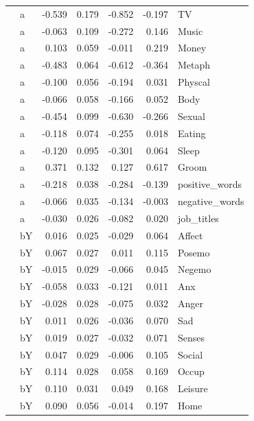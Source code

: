 \documentclass[11pt,a4paper]{article}
\begin{document}
\begin{longtable}{llrrrrl}
   & a & -0.539 &  0.179 &   -0.852 &    -0.197 &              TV \\
   & a & -0.063 &  0.109 &   -0.272 &     0.146 &           Music \\
   & a &  0.103 &  0.059 &   -0.011 &     0.219 &           Money \\
   & a & -0.483 &  0.064 &   -0.612 &    -0.364 &          Metaph \\
   & a & -0.100 &  0.056 &   -0.194 &     0.031 &         Physcal \\
   & a & -0.066 &  0.058 &   -0.166 &     0.052 &            Body \\
   & a & -0.454 &  0.099 &   -0.630 &    -0.266 &          Sexual \\
   & a & -0.118 &  0.074 &   -0.255 &     0.018 &          Eating \\
   & a & -0.120 &  0.095 &   -0.301 &     0.064 &           Sleep \\
   & a &  0.371 &  0.132 &    0.127 &     0.617 &           Groom \\
   & a & -0.218 &  0.038 &   -0.284 &    -0.139 &  positive\_words \\
   & a & -0.066 &  0.035 &   -0.134 &    -0.003 &  negative\_words \\
   & a & -0.030 &  0.026 &   -0.082 &     0.020 &      job\_titles \\
   & bY &  0.016 &  0.025 &   -0.029 &     0.064 &          Affect \\
   & bY &  0.067 &  0.027 &    0.011 &     0.115 &          Posemo \\
   & bY & -0.015 &  0.029 &   -0.066 &     0.045 &          Negemo \\
   & bY & -0.058 &  0.033 &   -0.121 &     0.011 &             Anx \\
   & bY & -0.028 &  0.028 &   -0.075 &     0.032 &           Anger \\
   & bY &  0.011 &  0.026 &   -0.036 &     0.070 &             Sad \\
   & bY &  0.019 &  0.027 &   -0.032 &     0.071 &          Senses \\
   & bY &  0.047 &  0.029 &   -0.006 &     0.105 &          Social \\
   & bY &  0.114 &  0.028 &    0.058 &     0.169 &           Occup \\
   & bY &  0.110 &  0.031 &    0.049 &     0.168 &         Leisure \\
   & bY &  0.090 &  0.056 &   -0.014 &     0.197 &            Home \\

\end{longtable}
\end{document}
